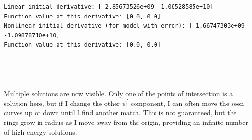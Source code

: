 \documentclass[11pt]{article}
\begin{document}
    \begin{Verbatim}[commandchars=\\\{\}]
Linear initial derivative: [ 2.85673526e+09 -1.06528585e+10]
Function value at this derivative: [0.0, 0.0]
Nonlinear initial derivative (for model with error): [ 1.66747303e+09
-1.09878710e+10]
Function value at this derivative: [0.0, 0.0]
    \end{Verbatim}

    \begin{center}
    \end{center}
    { \hspace*{\fill} \\}
    
    \begin{center}
    \end{center}
    { \hspace*{\fill} \\}
    
    Multiple solutions are now visible. Only one of the points of
intersection is a solution here, but if I change the other
\(\psi^\prime\) component, I can often move the seen curves up or down
until I find another match. This is not guaranteed, but the rings grow
in radius as I move away from the origin, providing an infinite number
of high energy solutions.
\end{document}
